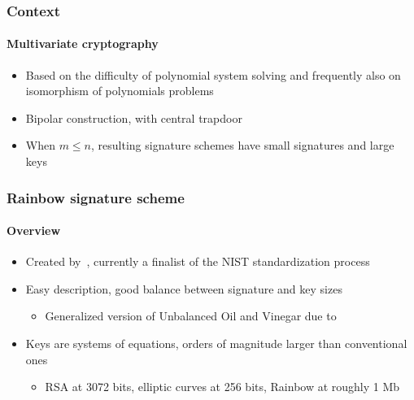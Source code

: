 \documentclass[12pt]{beamer}
\begin{document}
\begin{frame}
  \frametitle{Context}
  \framesubtitle{Multivariate cryptography}
  \begin{itemize}
    \item Based on the difficulty of polynomial system solving and frequently
        also on isomorphism of polynomials problems
    \item Bipolar construction, with central trapdoor
    \begin{figure}
      \vspace{2mm}
      \centering
    \end{figure}
    \item When $m \leq n$, resulting signature schemes have small signatures
        and large keys
  \end{itemize}
\end{frame}

\begin{frame}
  \frametitle{Rainbow signature scheme}
  \framesubtitle{Overview}
  \begin{itemize}
    \item Created by~\cite{Ding:200506}, currently a finalist of
        the NIST standardization process
    \item Easy description, good balance between signature and key sizes
    \begin{itemize}
      \item Generalized version of Unbalanced Oil and
          Vinegar due to~\cite{Kipnis:199904}
    \end{itemize}
    \item Keys are systems of equations, orders of magnitude larger than
        conventional ones
    \begin{itemize}
      \item RSA at 3072 bits, elliptic curves at 256 bits, Rainbow at roughly
          1 Mb
    \end{itemize}
  \end{itemize}
\end{frame}
\end{document}
